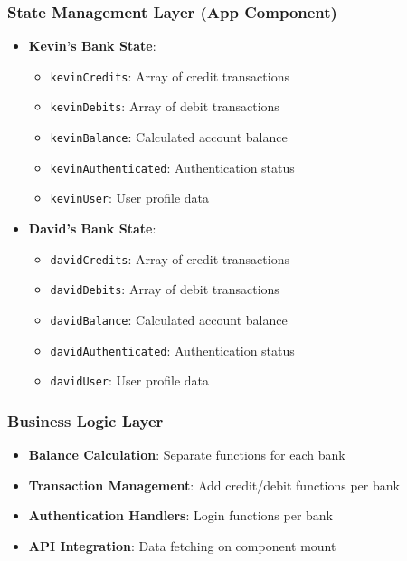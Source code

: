 \documentclass[11pt,a4paper]{article}
\begin{document}
\subsubsection{State Management Layer (App Component)}
\begin{itemize}[leftmargin=*]
    \item \textbf{Kevin's Bank State}:
        \begin{itemize}
            \item \texttt{kevinCredits}: Array of credit transactions
            \item \texttt{kevinDebits}: Array of debit transactions
            \item \texttt{kevinBalance}: Calculated account balance
            \item \texttt{kevinAuthenticated}: Authentication status
            \item \texttt{kevinUser}: User profile data
        \end{itemize}
    \item \textbf{David's Bank State}:
        \begin{itemize}
            \item \texttt{davidCredits}: Array of credit transactions
            \item \texttt{davidDebits}: Array of debit transactions
            \item \texttt{davidBalance}: Calculated account balance
            \item \texttt{davidAuthenticated}: Authentication status
            \item \texttt{davidUser}: User profile data
        \end{itemize}
\end{itemize}

\subsubsection{Business Logic Layer}
\begin{itemize}[leftmargin=*]
    \item \textbf{Balance Calculation}: Separate functions for each bank
    \item \textbf{Transaction Management}: Add credit/debit functions per bank
    \item \textbf{Authentication Handlers}: Login functions per bank
    \item \textbf{API Integration}: Data fetching on component mount
\end{itemize}
\end{document}
